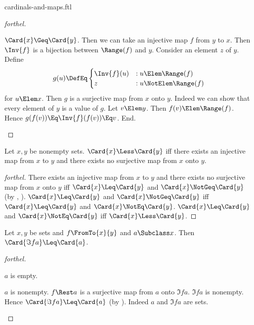 \documentclass{stex}
\begin{document}
\begin{smodule}{cardinals-and-maps.ftl}
\begin{proof}[forthel]
  \begin{case}{$\Card{x} \Geq \Card{y}$.}
    Then we can take an injective map $f$ from $y$ to $x$.
    Then $\Inv{f}$ is a bijection between $\Range(f)$ and $y$.
    Consider an element $z$ of $y$.
    Define \[ g(u) \DefEq
      \begin{cases}
        \Inv{f}(u) & : u \Elem \Range(f) \\
        z         & : u \NotElem \Range(f)
      \end{cases} \]
    for $u \Elem x$.
    Then $g$ is a surjective map from $x$ onto $y$.
    Indeed we can show that every element of $y$ is a value of $g$.
      Let $v \Elem y$.
      Then $f(v) \Elem \Range(f)$.
      Hence $g(f(v)) \Eq \Inv{f}(f(v)) \Eq v$.
    End.
  \end{case}
\end{proof}

\begin{proposition*}[forthel]
  Let $x, y$ be nonempty sets.
  $\Card{x} \Less \Card{y}$ iff there exists an injective map from $x$ to $y$ and there exists no surjective map from $x$ onto $y$.
\end{proposition*}
\begin{proof}[forthel]
  There exists an injective map from $x$ to $y$ and there exists no surjective map from $x$ onto $y$ iff $\Card{x} \Leq \Card{y}$ and $\Card{x} \NotGeq \Card{y}$ (by , ).
  $\Card{x} \Leq \Card{y}$ and $\Card{x} \NotGeq \Card{y}$ iff $\Card{x} \Leq \Card{y}$ and $\Card{x} \NotEq \Card{y}$.
  $\Card{x} \Leq \Card{y}$ and $\Card{x} \NotEq \Card{y}$ iff $\Card{x} \Less \Card{y}$.
\end{proof}

\begin{proposition*}[forthel,name=cardinality of image]
  Let $x, y$ be sets and $f \FromTo{x}{y}$ and $a \Subclass x$.
  Then $\Card{\Im{f}{a}} \Leq \Card{a}$.
\end{proposition*}
\begin{proof}[forthel]
  \begin{case}{$a$ is empty.} \end{case}

  \begin{case}{$a$ is nonempty.}
    $f \Rest a$ is a surjective map from $a$ onto $\Im{f}{a}$.
    $\Im{f}{a}$ is nonempty.
    Hence $\Card{\Im{f}{a}} \Leq \Card{a}$ (by ).
    Indeed $a$ and $\Im{f}{a}$ are sets.
  \end{case}
\end{proof}

\end{smodule}
\end{document}
